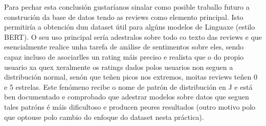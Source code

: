 \documentclass[12pt,a4paper]{article}
\begin{document}
Para pechar esta conclusión gustaríanos sinalar como posible traballo futuro a
construción da base de datos tendo as reviews como elemento principal. Isto
permitiría a obtención dun dataset útil para algúns modelos de Linguaxe (estilo
BERT). O seu uso principal sería adestralos sobre todo co texto das reviews e
que esencialmente realice unha tarefa de análise de sentimentos sobre eles,
sendo capaz incluso de asociarlles un rating máis preciso e realista que o do
propio usuario xa quex xeralmente os ratings dados polos usuarios non seguen a
distribución normal, senón que teñen picos nos extremos, moitas reviews teñen 0
e 5 estrelas. Este fenómeno recibe o nome de patrón de distribución en J e está
ben documentado \cite{hu2009overcoming} e comprobado que adestrar modelos
sobre datos que seguen tales patróns é máis dificultoso e producen peores
resultados \cite{johnson2019survey} (outro motivo polo que optouse polo cambio
do enfoque do dataset nesta práctica).
\newpage



\end{document}

